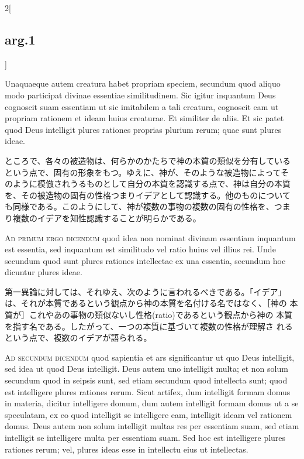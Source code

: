 \documentclass[paper=a4paper,fontsize=10pt,jafontsize=9pt,titlepage]{jlreq}
\begin{document}
\begin{paracol}{2}[\subsection{arg.1}]
\switchcolumn*

Unaquaeque autem creatura habet propriam speciem, secundum quod aliquo
modo participat divinae essentiae similitudinem. Sic igitur inquantum
Deus cognoscit suam essentiam ut sic imitabilem a tali creatura,
cognoscit eam ut propriam rationem et ideam huius creaturae. Et
similiter de aliis. Et sic patet quod Deus intelligit plures rationes
proprias plurium rerum; quae sunt plures ideae.

\switchcolumn

ところで、各々の被造物は、何らかのかたちで神の本質の類似を分有している
という点で、固有の形象をもつ。ゆえに、神が、そのような被造物によってそ
のように模倣されうるものとして自分の本質を認識する点で、神は自分の本質
を、その被造物の固有の性格つまりイデアとして認識する。他のものについて
も同様である。このようにして、神が複数の事物の複数の固有の性格を、つま
り複数のイデアを知性認識することが明らかである。

\switchcolumn*[\subsection{ad.1}]

{\scshape Ad primum ergo dicendum} quod idea non nominat divinam
essentiam inquantum est essentia, sed inquantum est similitudo vel
ratio huius vel illius rei. Unde secundum quod sunt plures rationes
intellectae ex una essentia, secundum hoc dicuntur plures ideae.

\switchcolumn

第一異論に対しては、それゆえ、次のように言われるべきである。「イデア」
は、それが本質であるという観点から神の本質を名付ける名ではなく、［神の
本質が］これやあの事物の類似ないし性格(ratio)であるという観点から神の
本質を指す名である。したがって、一つの本質に基づいて複数の性格が理解さ
れるという点で、複数のイデアが語られる。

\switchcolumn*[\subsection{ad.2}]

{\scshape Ad secundum dicendum} quod sapientia et ars significantur ut
quo Deus intelligit, sed idea ut quod Deus intelligit. Deus autem uno
intelligit multa; et non solum secundum quod in seipsis sunt, sed
etiam secundum quod intellecta sunt; quod est intelligere plures
rationes rerum. Sicut artifex, dum intelligit formam domus in materia,
dicitur intelligere domum, dum autem intelligit formam domus ut a se
speculatam, ex eo quod intelligit se intelligere eam, intelligit ideam
vel rationem domus. Deus autem non solum intelligit multas res per
essentiam suam, sed etiam intelligit se intelligere multa per
essentiam suam. Sed hoc est intelligere plures rationes rerum; vel,
plures ideas esse in intellectu eius ut intellectas.


\end{paracol}
\end{document}
